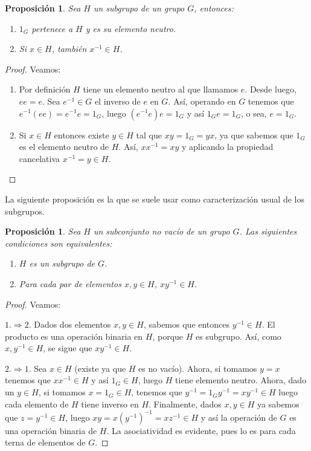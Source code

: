 \documentclass[12pt]{article}
\newtheorem{proposition}[theorem]{Proposición}
\begin{document}
\begin{proposition}Sea $H$ un subgrupo de un grupo $G$, entonces:
\begin{enumerate}
\item $1_G$ pertenece a $H$ y es su elemento neutro.
\item Si $x \in H$, también $x^{-1} \in H$.
\end{enumerate} 
\end{proposition}
\begin{proof}
Veamos:
\begin{enumerate}
\item Por definición $H$ tiene un elemento neutro al que llamamos $e$. Desde luego, $ee = e$. Sea $e^{-1} \in G$ el inverso de $e$ en $G$. Así, operando en $G$ tenemos que $e^{-1}(ee) = e^{-1}e = 1_G$, luego $(e^{-1}e)e = 1_G$ y así $1_Ge =1_G$, o sea, $e = 1_G$.
\item Si $x \in H$ entonces existe $y \in H$ tal que $xy = 1_G = yx$, ya que sabemos que $1_G$ es el elemento neutro de $H$. Así, $xx^{-1} = xy$ y aplicando la propiedad cancelativa $x^{-1} = y \in H$.
\end{enumerate}

\end{proof}

La siguiente proposición es la que se suele usar como caracterización usual de los subgrupos.

\begin{proposition}\label{prop:carSub} Sea $H$ un subconjunto no vacío de un grupo $G$. Las siguientes condiciones son equivalentes:
\begin{enumerate}
\item $H$ es un subgrupo de $G$.
\item Para cada par de elementos $x,y \in H$, $xy^{-1} \in H$.
\end{enumerate}
\end{proposition}
\begin{proof}
Veamos: 

$1. \Rightarrow 2.$ Dados dos elementos $x,y \in H$, sabemos que entonces $y ^{-1} \in H$. El producto es una operación binaria en $H$, porque $H$ es subgrupo. Así, como $x, y^{-1} \in H$, se sigue que $xy^{-1} \in H$.

$2. \Rightarrow 1.$ Sea $x \in H$ (existe ya que $H$ es no vacío). Ahora, si tomamos $y = x$ tenemos que $xx^{-1} \in H$ y así $1_{G} \in H$, luego $H$ tiene elemento neutro. Ahora, dado un $y \in H$, si tomamos $x = 1_{G} \in H$, tenemos que $y^{-1} = 1_{G}y^{-1} = xy^{-1} \in H$ luego cada elemento de $H$ tiene inverso en $H$. Finalmente, dados $x,y \in H$ ya sabemos que $z = y^{-1} \in H$, luego $xy = x(y^{-1})^{-1} = xz^{-1} \in H$ y así la operación de $G$ es una operación binaria de $H$. La asociatividad es evidente, pues lo es para cada terna de elementos de $G$.

\end{proof}
\end{document}
